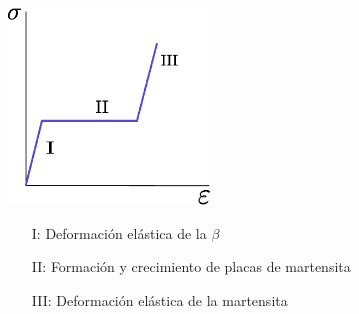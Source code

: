 \documentclass[usenames,dvipsnames]{beamer}
\begin{document}
\begin{frame}

 
\begin{multicols}{2}
 
 \includegraphics[width=0.4\textwidth]{img/intro/SigmavsDef.eps}
 
 
 \begin{itemize}
  \item[I: ] \alert<1>{Deformación elástica de la $\beta$}
  \item[II: ]\alert<2>{Formación y crecimiento de placas de martensita}
  \item[III: ]\alert<3>{Deformación elástica de la martensita}
 \end{itemize}

 
 \end{multicols}
 
\end{frame}

\end{document}
